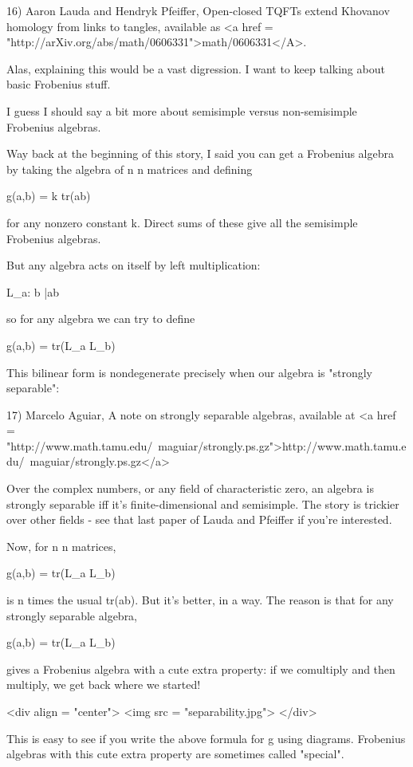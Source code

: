 16) Aaron Lauda and Hendryk Pfeiffer, Open-closed TQFTs extend 
Khovanov homology from links to tangles, available as 
<a href = "http://arXiv.org/abs/math/0606331">math/0606331</A>.

Alas, explaining this would be a vast digression.  I want to keep
talking about basic Frobenius stuff.

I guess I should say a bit more about semisimple versus 
non-semisimple Frobenius algebras.  

Way back at the beginning of this story, I said you can get a 
Frobenius algebra by taking the algebra of n \times  n matrices and 
defining

g(a,b) = k tr(ab)

for any nonzero constant k.  Direct sums of these give all the
semisimple Frobenius algebras. 

But any algebra acts on itself by left multiplication:

L_{a}: b |\to  ab

so for any algebra we can try to define 

g(a,b) = tr(L_{a} L_{b})

This bilinear form is nondegenerate precisely when our algebra is
"strongly separable":

17) Marcelo Aguiar, A note on strongly separable algebras, available
at <a href = "http://www.math.tamu.edu/~maguiar/strongly.ps.gz">http://www.math.tamu.edu/~maguiar/strongly.ps.gz</a>

Over the complex numbers, or any field of characteristic zero, an 
algebra is strongly separable iff it's finite-dimensional and 
semisimple.  The story is trickier over other fields - see that 
last paper of Lauda and Pfeiffer if you're interested.

Now, for n \times  n matrices, 

g(a,b) = tr(L_{a} L_{b})

is n times the usual tr(ab).  But it's better, in a way.  The reason
is that for any strongly separable algebra, 

g(a,b) = tr(L_{a} L_{b})

gives a Frobenius algebra with a cute extra property: if we 
comultiply and then multiply, we get back where we started!  

<div align = "center">
<img src = "separability.jpg">
</div>

This is 
easy to see if you write the above formula for g using diagrams.  
Frobenius algebras with this cute extra property are sometimes 
called "special".   


